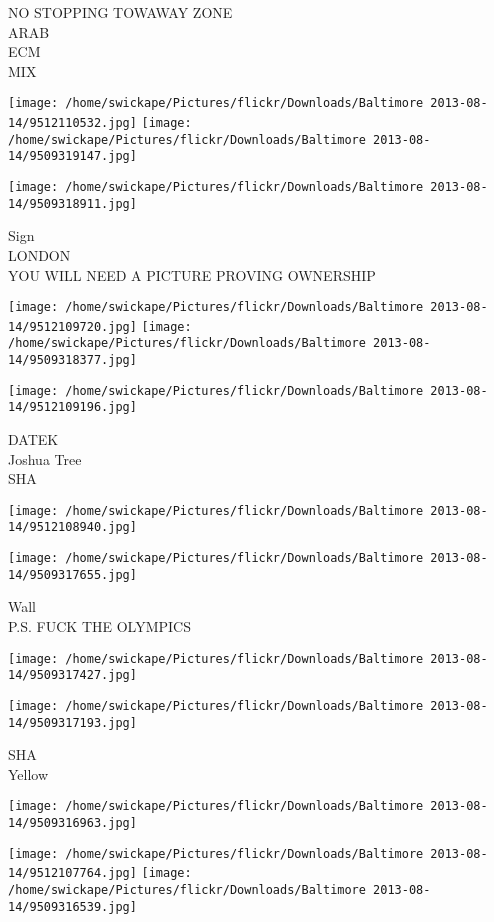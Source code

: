 \documentclass[10pt,letterpaper]{article}
\begin{document}
NO STOPPING TOWAWAY ZONE\\
ARAB\\
ECM\\
MIX
\pagebreak

\texttt{[image: /home/swickape/Pictures/flickr/Downloads/Baltimore 2013-08-14/9512110532.jpg]}
\texttt{[image: /home/swickape/Pictures/flickr/Downloads/Baltimore 2013-08-14/9509319147.jpg]}

\vspace{0.25in}
\texttt{[image: /home/swickape/Pictures/flickr/Downloads/Baltimore 2013-08-14/9509318911.jpg]}

Sign\\
LONDON\\
YOU WILL NEED A PICTURE PROVING OWNERSHIP
\pagebreak

\texttt{[image: /home/swickape/Pictures/flickr/Downloads/Baltimore 2013-08-14/9512109720.jpg]}
\texttt{[image: /home/swickape/Pictures/flickr/Downloads/Baltimore 2013-08-14/9509318377.jpg]}

\texttt{[image: /home/swickape/Pictures/flickr/Downloads/Baltimore 2013-08-14/9512109196.jpg]}

DATEK\\
Joshua Tree\\
SHA
\pagebreak

\texttt{[image: /home/swickape/Pictures/flickr/Downloads/Baltimore 2013-08-14/9512108940.jpg]}

\vspace{0.25in}
\texttt{[image: /home/swickape/Pictures/flickr/Downloads/Baltimore 2013-08-14/9509317655.jpg]}

Wall\\
P.S. FUCK THE OLYMPICS
\pagebreak

\texttt{[image: /home/swickape/Pictures/flickr/Downloads/Baltimore 2013-08-14/9509317427.jpg]}

\vspace{0.25in}
\texttt{[image: /home/swickape/Pictures/flickr/Downloads/Baltimore 2013-08-14/9509317193.jpg]}

SHA\\
Yellow
\pagebreak

\texttt{[image: /home/swickape/Pictures/flickr/Downloads/Baltimore 2013-08-14/9509316963.jpg]}

\vspace{0.25in}
\texttt{[image: /home/swickape/Pictures/flickr/Downloads/Baltimore 2013-08-14/9512107764.jpg]}
\texttt{[image: /home/swickape/Pictures/flickr/Downloads/Baltimore 2013-08-14/9509316539.jpg]}
\end{document}
